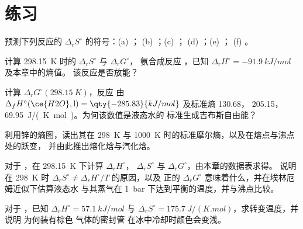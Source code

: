 \section{练习}

\begin{exercise}[$\star$]\label{exo:b2:reaction-free-energy:1}
预测下列反应的 $\Delta_r S^\circ$ 的符号：(a) ；
(b) ；(c) ；
(d) ；(e) ；
(f) 。
\end{exercise}

\begin{exercise}[$\star$]\label{exo:b2:reaction-free-energy:2}
计算 \qty{298.15}{K} 时的 $\Delta_r S^\circ$ 与 $\Delta_r G^\circ$，
氨合成反应 ，已知 $\Delta_r
H^\circ = \qty{-91.9}{kJ/mol}$ 及本章中的熵值。
该反应是否放能？
\end{exercise}

\begin{exercise}[$\star$]\label{exo:b2:reaction-free-energy:3}
计算 $\Delta_r G^\circ(\qty{298.15}{K})$，反应  由 $\Delta_f H^\circ(\ce{H2O}, \text{l}) = \qty{-285.83}{kJ/mol}$
及标准熵  130.68， 205.15，
 \qty{69.95}{J/(K.mol)}。为何该数值是液态水的
标准生成吉布斯自由能？
\end{exercise}

\begin{exercise}[$\star$]\label{exo:b2:reaction-free-energy:4}
利用锌的熵图，读出其在
\qty{298}{K} 与 \qty{1000}{K} 时的标准摩尔熵，以及在熔点与沸点处的跃变，
并由此推出熔化焓与汽化焓。
\end{exercise}

\begin{exercise}[$\star\star$]\label{exo:b2:reaction-free-energy:5}
对于 ，在 \qty{298.15}{K} 下计算 $\Delta_r H^\circ$，
$\Delta_r S^\circ$ 与 $\Delta_r G^\circ$，由本章的数据表求得。
说明在 \qty{298}{K} 时 $\Delta_r S^\circ \neq \Delta_r H^\circ/T$ 的原因，以及
正的 $\Delta_r G^\circ$ 意味着什么，并在埃林厄姆近似下估算液态水
与其蒸气在
\qty{1}{bar} 下达到平衡的温度，并与沸点比较。
\end{exercise}

\begin{exercise}[$\star\star$]\label{exo:b2:reaction-free-energy:6}
对于 ，已知 $\Delta_r H^\circ = \qty{57.1}{kJ/mol}$ 与
$\Delta_r S^\circ = \qty{175.7}{J/(K.mol)}$，求转变温度，并说明
为何装有棕色  气体的密封管
在冰中冷却时颜色会变浅。
\end{exercise}

